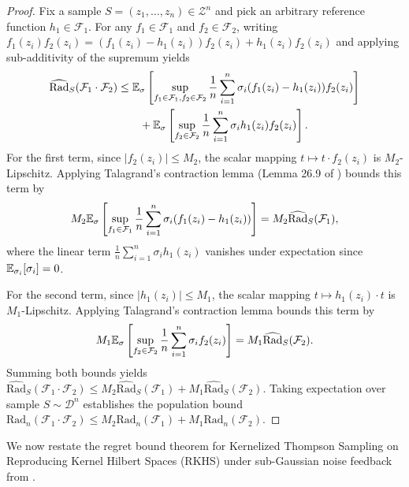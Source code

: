 \begin{proof}
Fix a sample $S = (z_1, \dots, z_n) \in \mathcal{Z}^n$ and pick an arbitrary reference function $h_1 \in \mathcal{F}_1$. For any $f_1 \in \mathcal{F}_1$ and $f_2 \in \mathcal{F}_2$, writing $f_1(z_i) f_2(z_i) = (f_1(z_i) - h_1(z_i)) f_2(z_i) + h_1(z_i) f_2(z_i)$ and applying sub-additivity of the supremum yields
\begin{align*}
    \widehat{\mathrm{Rad}}_S(\mathcal{F}_1 \cdot \mathcal{F}_2) &\le \mathbb{E}_\sigma \left[ \sup_{f_1 \in \mathcal{F}_1, f_2 \in \mathcal{F}_2} \frac{1}{n}\sum_{i=1}^n \sigma_i (f_1(z_i) - h_1(z_i)) f_2(z_i) \right] \\
    &\qquad + \mathbb{E}_\sigma \left[ \sup_{f_2 \in \mathcal{F}_2} \frac{1}{n}\sum_{i=1}^n \sigma_i h_1(z_i) f_2(z_i) \right].
\end{align*}
For the first term, since $|f_2(z_i)| \le M_2$, the scalar mapping $t \mapsto t \cdot f_2(z_i)$ is $M_2$-Lipschitz. Applying Talagrand's contraction lemma (Lemma 26.9 of \citealp{shalevshwartz2014understanding}) bounds this term by
\begin{equation*}
    M_2 \mathbb{E}_\sigma \left[ \sup_{f_1 \in \mathcal{F}_1} \frac{1}{n}\sum_{i=1}^n \sigma_i (f_1(z_i) - h_1(z_i)) \right] = M_2 \widehat{\mathrm{Rad}}_S(\mathcal{F}_1),
\end{equation*}
where the linear term $\frac{1}{n}\sum_{i=1}^n \sigma_i h_1(z_i)$ vanishes under expectation since $\mathbb{E}_{\sigma_i}[\sigma_i] = 0$.

For the second term, since $|h_1(z_i)| \le M_1$, the scalar mapping $t \mapsto h_1(z_i) \cdot t$ is $M_1$-Lipschitz. Applying Talagrand's contraction lemma bounds this term by
\begin{equation*}
    M_1 \mathbb{E}_\sigma \left[ \sup_{f_2 \in \mathcal{F}_2} \frac{1}{n}\sum_{i=1}^n \sigma_i f_2(z_i) \right] = M_1 \widehat{\mathrm{Rad}}_S(\mathcal{F}_2).
\end{equation*}
Summing both bounds yields $\widehat{\mathrm{Rad}}_S(\mathcal{F}_1 \cdot \mathcal{F}_2) \le M_2 \widehat{\mathrm{Rad}}_S(\mathcal{F}_1) + M_1 \widehat{\mathrm{Rad}}_S(\mathcal{F}_2)$. Taking expectation over sample $S \sim \mathcal{D}^n$ establishes the population bound $\mathrm{Rad}_n(\mathcal{F}_1 \cdot \mathcal{F}_2) \le M_2 \mathrm{Rad}_n(\mathcal{F}_1) + M_1 \mathrm{Rad}_n(\mathcal{F}_2)$.
\end{proof}

We now restate the regret bound theorem for Kernelized Thompson Sampling on Reproducing Kernel Hilbert Spaces (RKHS) under sub-Gaussian noise feedback from \citet{chowdhury2017kernelized}.

